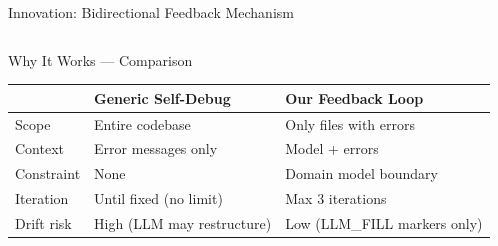 \documentclass[10pt,aspectratio=169]{beamer}
\begin{document}
\begin{frame}[fragile]{Innovation: Bidirectional Feedback Mechanism}
\begin{columns}[T]
\vspace{8pt}
\begin{block}{Why It Works --- Comparison}
\setlength{\tabcolsep}{4pt}
\begin{tabular}{l|p{2.8cm}|p{3.5cm}}
\toprule
& \textbf{Generic Self-Debug} & \textbf{Our Feedback Loop} \\
\midrule
Scope & Entire codebase & Only files with errors \\
Context & Error messages only & Model + errors \\
Constraint & None & Domain model boundary \\
Iteration & Until fixed (no limit) & Max 3 iterations \\
Drift risk & High (LLM may restructure) & Low (LLM\_FILL markers only) \\
\bottomrule
\end{tabular}
\end{block}
\end{columns}

\end{frame}

\end{document}
